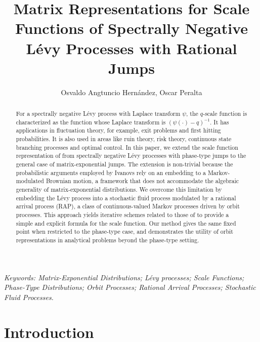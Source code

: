\documentclass[a4paper,11pt]{article}
\title{Matrix Representations for Scale Functions of Spectrally Negative Lévy Processes with Rational Jumps}
\author{Osvaldo Angtuncio Hern\'andez, Oscar Peralta}
\date{}
\numberwithin{equation}{section}
\theoremstyle{plain}
\theoremstyle{definition}
\newcommand{\1}{\mathbf{1}}
\begin{document}
\maketitle

\begin{abstract}
For a spectrally negative L\'evy process with Laplace transform $\psi$, the $q$-scale function is characterized as the function whose Laplace transform is $(\psi(\cdot)-q)^{-1}$. 
It has applications in fluctuation theory, for example, exit problems and  first hitting probabilities. 
It is also used in areas like ruin theory, risk theory, continuous state branching processes and optimal control. 
In this paper, we extend the scale function representation of \cite{Ivanovs2021} from spectrally negative Lévy processes with phase-type jumps to the general case of matrix-exponential jumps. The extension is non-trivial because the probabilistic arguments employed by Ivanovs rely on an embedding to a Markov-modulated Brownian motion, a framework that does not accommodate the algebraic generality of matrix-exponential distributions. 
We overcome this limitation by embedding the L\'evy process into a stochastic fluid process modulated by a rational arrival process (RAP), a class of continuous-valued Markov processes driven by orbit processes.
This approach yields iterative schemes related to those of \cite{Ivanovs2021} to provide a simple and explicit formula for the scale function. Our method gives the same fixed point when restricted to the phase-type case, and demonstrates the utility of orbit representations in analytical problems beyond the phase-type setting.
\end{abstract}

\textit{Keywords: Matrix-Exponential Distributions; L\'evy processes; Scale Functions; Phase-Type Distributions; Orbit Processes; Rational Arrival Processes; Stochastic Fluid Processes.}

\tableofcontents
\newpage

\section{Introduction}
\end{document}
